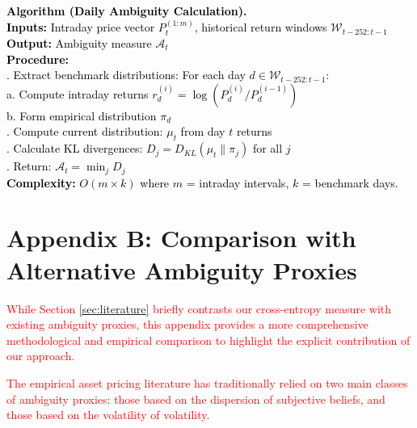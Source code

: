 \documentclass[preprint,12pt,authoryear]{elsarticle}
\begin{document}
\vspace{\baselineskip}
\noindent
\textcolor{black}{
\textbf{Algorithm (Daily Ambiguity Calculation).}\\
\textbf{Inputs:} Intraday price vector $P_{t}^{(1:m)}$, historical return windows $\mathcal{W}_{t-252:t-1}$\\
\textbf{Output:} Ambiguity measure $\mathcal{A}_t$\\
\textbf{Procedure:}\\
. Extract benchmark distributions: For each day $d \in \mathcal{W}_{t-252:t-1}$:\\
\indent\indent a. Compute intraday returns $r^{(i)}_d = \log(P^{(i)}_d/P^{(i-1)}_d)$\\
\indent\indent b. Form empirical distribution $\pi_d$\\
. Compute current distribution: $\mu_t$ from day $t$ returns\\
. Calculate KL divergences: $D_j = D_{KL}(\mu_t \| \pi_j)$ for all $j$\\
. Return: $\mathcal{A}_t = \min_j D_j$\\
\textbf{Complexity:} $O(m \times k)$ where $m$ = intraday intervals, $k$ = benchmark days.
}

\section*{Appendix B: Comparison with Alternative Ambiguity Proxies}
\label{app:alternative_proxies}
\renewcommand{\theequation}{B.\arabic{equation}}
\setcounter{equation}{0}

\textcolor{red}{While Section \ref{sec:literature} briefly contrasts our cross-entropy measure with existing ambiguity proxies, this appendix provides a more comprehensive methodological and empirical comparison to highlight the explicit contribution of our approach.}

\textcolor{red}{The empirical asset pricing literature has traditionally relied on two main classes of ambiguity proxies: those based on the dispersion of subjective beliefs, and those based on the volatility of volatility.}
\end{document}
